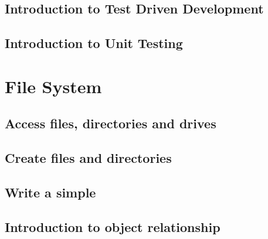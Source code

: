 \documentclass[
]{book}
\begin{document}
\hypertarget{introduction-to-test-driven-development}{%
\section{Introduction to Test Driven Development}\label{introduction-to-test-driven-development}}

\hypertarget{introduction-to-unit-testing}{%
\section{Introduction to Unit Testing}\label{introduction-to-unit-testing}}

\hypertarget{file-system}{%
\chapter{File System}\label{file-system}}

\hypertarget{access-files-directories-and-drives}{%
\section{Access files, directories and drives}\label{access-files-directories-and-drives}}

\hypertarget{create-files-and-directories}{%
\section{Create files and directories}\label{create-files-and-directories}}

\hypertarget{write-a-simple}{%
\section{Write a simple}\label{write-a-simple}}

\hypertarget{introduction-to-object-relationship}{%
\section{Introduction to object relationship}\label{introduction-to-object-relationship}}

  
\end{document}
